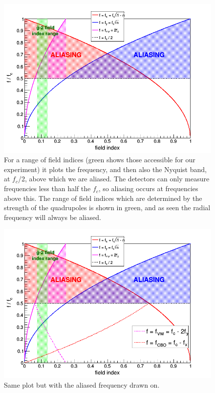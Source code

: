 \begin{figure}[ht]
\centering 
\includegraphics[scale=0.5]{Figures/freq_vs_n.png}
\decoRule
\caption{For a range of field indices (green shows those accessible for our experiment) it plots the frequency, and then also the Nyquist band, at $f_{c}$/2, above which we are aliased. The detectors can only measure frequencies less than half the $f_{c}$, so aliasing occurs at frequencies above this. The range of field indices which are determined by the strength of the quadrupoles is shown in green, and as seen the radial frequency will always be aliased.}
\label{fig:freq_vs_n.png}
\end{figure}

\begin{figure}[ht]
\centering 
\includegraphics[scale=0.5]{Figures/freq_vs_n_alias.png}
\decoRule
\caption{Same plot but with the aliased frequency drawn on.}
\label{fig:freq_vs_n_alias.png}
\end{figure}

